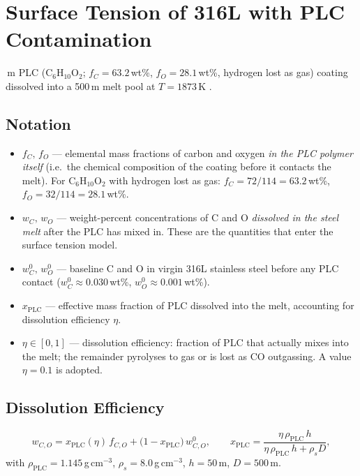 \documentclass[11pt,a4paper]{article}
\begin{document}
\thispagestyle{empty}

\section{Surface Tension of 316L with PLC Contamination}

\,\textmu m PLC (C$_6$H$_{10}$O$_2$; $f_C=63.2$\,wt\%,
$f_O=28.1$\,wt\%, hydrogen lost as gas) coating dissolved into a
500\,\textmu m melt pool at $T=1873$\,K \cite{morohoshi2013}.

\subsection{Notation}

\begin{itemize}
  \item $f_C,\,f_O$ --- elemental mass fractions of carbon and oxygen
        \emph{in the PLC polymer itself} (i.e.\ the chemical composition of
        the coating before it contacts the melt).
        For C$_6$H$_{10}$O$_2$ with hydrogen lost as gas:
        $f_C = 72/114 = 63.2$\,wt\%, $f_O = 32/114 = 28.1$\,wt\%.
  \item $w_C,\,w_O$ --- weight-percent concentrations of C and O
        \emph{dissolved in the steel melt} after the PLC has mixed in.
        These are the quantities that enter the surface tension model.
  \item $w_C^{0},\,w_O^{0}$ --- baseline C and O in virgin 316L stainless
        steel before any PLC contact ($w_C^0\approx0.030$\,wt\%,
        $w_O^0\approx0.001$\,wt\%).
  \item $x_\text{PLC}$ --- effective mass fraction of PLC dissolved into the
        melt, accounting for dissolution efficiency $\eta$.
  \item $\eta\in[0,1]$ --- dissolution efficiency: fraction of PLC that
        actually mixes into the melt; the remainder pyrolyses to gas or is
        lost as CO outgassing. A value $\eta=0.1$ is adopted.
\end{itemize}

\subsection{Dissolution Efficiency}

\begin{equation}
  w_{C,O} = x_\text{PLC}(\eta)\,f_{C,O} + \bigl(1-x_\text{PLC}\bigr)\,w_{C,O}^{0},
  \qquad
  x_\text{PLC} = \frac{\eta\,\rho_\text{PLC}\,h}{\eta\,\rho_\text{PLC}\,h + \rho_s D},
\end{equation}
with $\rho_\text{PLC}=1.145$\,g\,cm$^{-3}$, $\rho_s=8.0$\,g\,cm$^{-3}$,
$h=50$\,\textmu m, $D=500$\,\textmu m.
\end{document}
